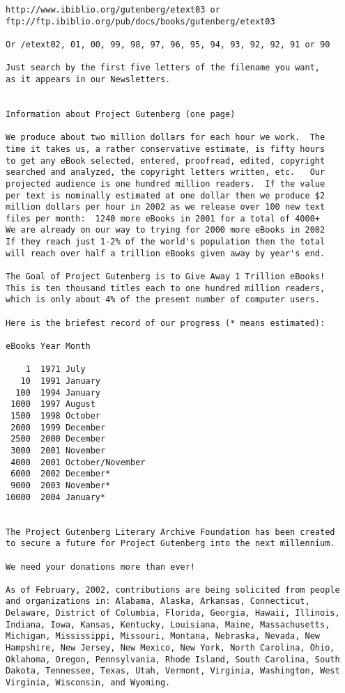 \documentclass[oneside]{article}
\begin{document}
\begin{verbatim}
http://www.ibiblio.org/gutenberg/etext03 or
ftp://ftp.ibiblio.org/pub/docs/books/gutenberg/etext03

Or /etext02, 01, 00, 99, 98, 97, 96, 95, 94, 93, 92, 92, 91 or 90

Just search by the first five letters of the filename you want,
as it appears in our Newsletters.


Information about Project Gutenberg (one page)

We produce about two million dollars for each hour we work.  The
time it takes us, a rather conservative estimate, is fifty hours
to get any eBook selected, entered, proofread, edited, copyright
searched and analyzed, the copyright letters written, etc.   Our
projected audience is one hundred million readers.  If the value
per text is nominally estimated at one dollar then we produce $2
million dollars per hour in 2002 as we release over 100 new text
files per month:  1240 more eBooks in 2001 for a total of 4000+
We are already on our way to trying for 2000 more eBooks in 2002
If they reach just 1-2% of the world's population then the total
will reach over half a trillion eBooks given away by year's end.

The Goal of Project Gutenberg is to Give Away 1 Trillion eBooks!
This is ten thousand titles each to one hundred million readers,
which is only about 4% of the present number of computer users.

Here is the briefest record of our progress (* means estimated):

eBooks Year Month

    1  1971 July
   10  1991 January
  100  1994 January
 1000  1997 August
 1500  1998 October
 2000  1999 December
 2500  2000 December
 3000  2001 November
 4000  2001 October/November
 6000  2002 December*
 9000  2003 November*
10000  2004 January*


The Project Gutenberg Literary Archive Foundation has been created
to secure a future for Project Gutenberg into the next millennium.

We need your donations more than ever!

As of February, 2002, contributions are being solicited from people
and organizations in: Alabama, Alaska, Arkansas, Connecticut,
Delaware, District of Columbia, Florida, Georgia, Hawaii, Illinois,
Indiana, Iowa, Kansas, Kentucky, Louisiana, Maine, Massachusetts,
Michigan, Mississippi, Missouri, Montana, Nebraska, Nevada, New
Hampshire, New Jersey, New Mexico, New York, North Carolina, Ohio,
Oklahoma, Oregon, Pennsylvania, Rhode Island, South Carolina, South
Dakota, Tennessee, Texas, Utah, Vermont, Virginia, Washington, West
Virginia, Wisconsin, and Wyoming.


\end{verbatim}
\end{document}
